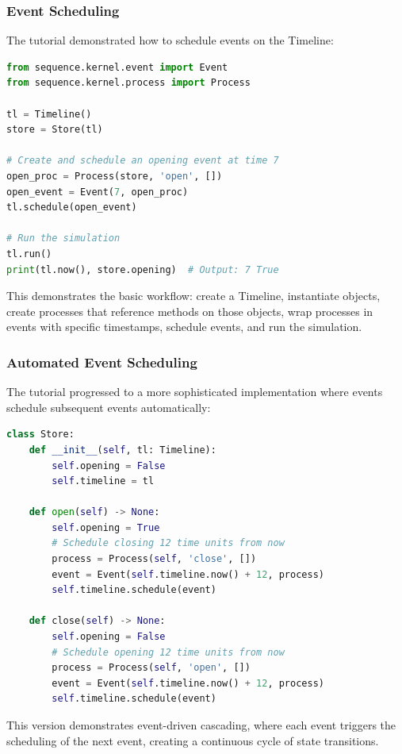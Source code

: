 \subsubsection{Event Scheduling}

The tutorial demonstrated how to schedule events on the Timeline:

\begin{lstlisting}[language=Python, breaklines=true]
from sequence.kernel.event import Event
from sequence.kernel.process import Process

tl = Timeline()
store = Store(tl)

# Create and schedule an opening event at time 7
open_proc = Process(store, 'open', [])
open_event = Event(7, open_proc)
tl.schedule(open_event)

# Run the simulation
tl.run()
print(tl.now(), store.opening)  # Output: 7 True
\end{lstlisting}

This demonstrates the basic workflow: create a Timeline, instantiate objects, create processes that reference methods on those objects, wrap processes in events with specific timestamps, schedule events, and run the simulation.

\subsubsection{Automated Event Scheduling}

The tutorial progressed to a more sophisticated implementation where events schedule subsequent events automatically:

\begin{lstlisting}[language=Python, breaklines=true]
class Store:
    def __init__(self, tl: Timeline):
        self.opening = False
        self.timeline = tl

    def open(self) -> None:
        self.opening = True
        # Schedule closing 12 time units from now
        process = Process(self, 'close', [])
        event = Event(self.timeline.now() + 12, process)
        self.timeline.schedule(event)

    def close(self) -> None:
        self.opening = False
        # Schedule opening 12 time units from now
        process = Process(self, 'open', [])
        event = Event(self.timeline.now() + 12, process)
        self.timeline.schedule(event)
\end{lstlisting}

This version demonstrates event-driven cascading, where each event triggers the scheduling of the next event, creating a continuous cycle of state transitions.

